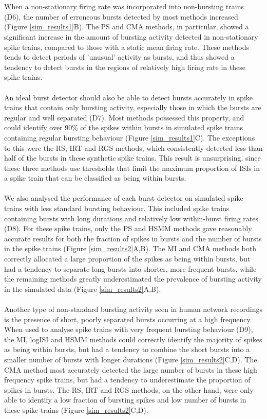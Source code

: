 \documentclass[12pt, titlepage]{article}
\begin{document}
	\\ \\ When a non-stationary firing rate was incorporated into non-bursting trains (D6), the number of erroneous bursts detected by most methods increased (Figure \ref{sim_results1}B). The PS and CMA methods, in particular, showed a significant increase in the amount of bursting activity detected in non-stationary spike trains, compared to those with a static mean firing rate. These methods tends to detect periods of 'unusual' activity as bursts, and thus showed a tendency to detect bursts in the regions of relatively high firing rate in these spike trains. 
	\\ \\ An ideal burst detector should also be able to detect bursts accurately in spike trains that contain only bursting activity, especially those in which the bursts are regular and well separated (D7). Most methods possessed this property, and could identify over 90\% of the spikes within bursts in simulated spike trains containing regular bursting behaviour (Figure \ref{sim_results1}C). The exceptions to this were the RS, IRT and RGS methods, which consistently detected less than half of the bursts in these synthetic spike trains. This result is unsurprising, since these three methods use thresholds that limit the maximum proportion of ISIs in a spike train that can be classified as being within bursts.
	\\ \\ We also analysed the performance of each burst detector on simulated spike trains with less standard bursting behaviour. This included  spike trains containing bursts with long durations and relatively low within-burst firing rates (D8). For these spike trains, only the PS and HSMM methods gave reasonably accurate results for both the fraction of spikes in bursts and the number of bursts in the spike trains (Figure \ref{sim_results2}A,B). The MI and CMA methods both correctly allocated a large proportion of the spikes as being within bursts, but had a tendency to separate long bursts into shorter, more frequent bursts, while the remaining methods greatly underestimated the prevalence of bursting activity in the simulated data (Figure \ref{sim_results2}A,B).
	\\ \\ Another type of non-standard bursting activity seen in human network recordings is the presence of short, poorly separated bursts occurring at a high frequency. When used to analyse spike trains with very frequent bursting behaviour (D9), the MI, logISI and HSMM methods could correctly identify the majority of spikes as being within bursts, but had a tendency to combine the short bursts into a smaller number of bursts with longer durations (Figure \ref{sim_results2}C,D). The CMA method most accurately detected the large number of bursts in these high frequency spike trains, but had a tendency to underestimate the proportion of spikes in bursts. The RS, IRT and RGS methods, on the other hand, were only able to identify a low fraction of bursting spikes and low number of bursts in these spike trains (Figure \ref{sim_results2}C,D).
\end{document}
